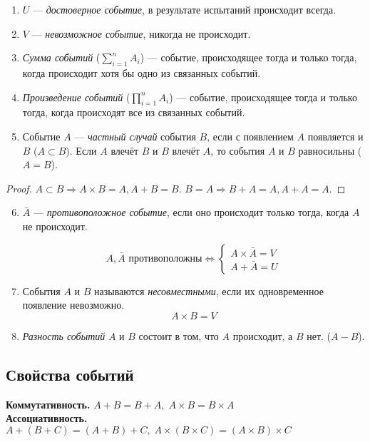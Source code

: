 \begin{enumerate}
	\item $U$ --- \textit{достоверное событие}, в результате испытаний происходит всегда.
	\item $V$ --- \textit{невозможное событие}, никогда не происходит.
	\item \textit{Сумма событий} ($\sum\limits_{i=1}^n A_i$) --- событие, происходящее тогда и только тогда, когда происходит хотя бы одно из связанных событий.
	\item \textit{Произведение событий} ($\prod\limits_{i=1}^n A_i$) --- событие, происходящее тогда и только тогда, когда происходят все из связанных событий.
	\item Событие $A$ --- \textit{частный случай} события $B$, если с появлением $A$ появляется и $B$ ($A \subset B$). Если $A$ влечёт $B$ и $B$ влечёт $A$, то события $A$ и $B$ равносильны ($A = B$).
\end{enumerate}
\begin{proof}
	$A \subset B \Rightarrow A\times B = A, A + B = B.$
	$B = A \Rightarrow B + A = A, A + A = A.$
\end{proof}
\begin{enumerate}
	\setcounter{enumi}{5}
	\item $\bar{A}$ --- \textit{противоположное событие}, если оно происходит только тогда, когда $A$ не происходит.

	      \[
		      A  ,  \bar{A} \text{ противоположны} \Leftrightarrow
		      \begin{cases}
			      A\times \bar{A} = V \\
			      A + \bar{A} = U
		      \end{cases}
	      \]

	\item События $A$ и $B$ называются \textit{несовместными}, если их одновременное появление невозможно.
	      $$A\times B = V$$

	\item \textit{Разность событий} $A$ и $B$ состоит в том, что $A$ происходит, а $B$ нет. ($A - B$).
\end{enumerate}

\subsection{Свойства событий}
\textbf{Коммутативность.} $A + B = B + A, \; A\times B = B\times A$ \\

\textbf{Ассоциативность.} $A + (B + C)=(A + B) + C, \; A\times (B\times C) = (A\times B)\times C$ \\

